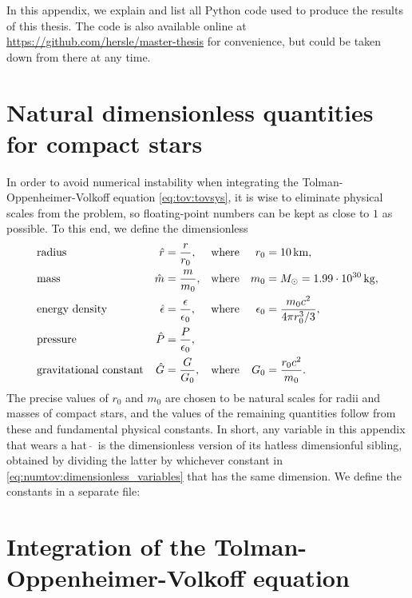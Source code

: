 In this appendix, we explain and list all Python code used to produce the results of this thesis.
The code is also available online at \url{https://github.com/hersle/master-thesis} for convenience,
but could be taken down from there at any time.

\section{Natural dimensionless quantities for compact stars}

In order to avoid numerical instability when integrating the Tolman-Oppenheimer-Volkoff equation \eqref{eq:tov:tovsys},
it is wise to eliminate physical scales from the problem,
so floating-point numbers can be kept as close to $1$ as possible.
To this end, we define the dimensionless
\begin{subequations}
\begin{align}
	& \text{radius}                 & \hat{r}        &= \frac{r}{r_0}               , & \text{where} && r_0        &= \SI{10}{\kilo\meter} , \\
	& \text{mass}                   & \hat{m}        &= \frac{m}{m_0}               , & \text{where} && m_0        &= M_\odot = \SI{1.99e30}{\kilogram} , \\
	& \text{energy density}         & \hat{\epsilon} &= \frac{\epsilon}{\epsilon_0} , & \text{where} && \epsilon_0 &= \frac{m_0 c^2}{4 \pi r_0^3 / 3} , \\
	& \text{pressure}               &  \hat{P}       &= \frac{P}{\epsilon_0}        , \\
	& \text{gravitational constant} & \hat{G}        &= \frac{G}{G_0}               , & \text{where} && G_0 &= \frac{r_0 c^2}{m_0} .
\end{align}%
\label{eq:numtov:dimensionless_variables}%
\end{subequations}%
The precise values of $r_0$ and $m_0$ are chosen to be natural scales for radii and masses of compact stars, and the values of the remaining quantities follow from these and fundamental physical constants.
In short, any variable in this appendix that wears a hat $\, \hat{} \, $ is the dimensionless version of its hatless dimensionful sibling, obtained by dividing the latter by whichever constant in \cref{eq:numtov:dimensionless_variables} that has the same dimension.
We define the constants in a separate file:


\section{Integration of the Tolman-Oppenheimer-Volkoff equation}
\label{sec:nstars:numtov}

